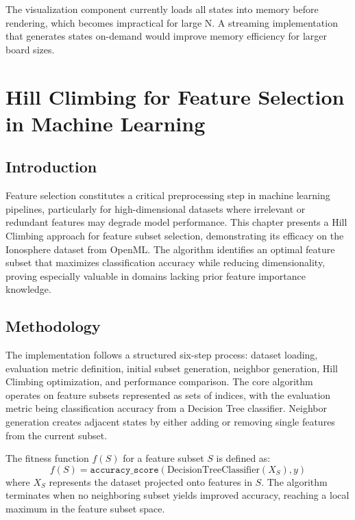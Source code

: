 \documentclass{report}
\begin{document}
	The visualization component currently loads all states into memory before rendering, which becomes impractical for large N. A streaming implementation that generates states on-demand would improve memory efficiency for larger board sizes.
	
	
	
	
	
	\chapter{Hill Climbing for Feature Selection in Machine Learning}
	
	\section{Introduction}
	Feature selection constitutes a critical preprocessing step in machine learning pipelines, particularly for high-dimensional datasets where irrelevant or redundant features may degrade model performance. This chapter presents a Hill Climbing approach for feature subset selection, demonstrating its efficacy on the Ionosphere dataset from OpenML. The algorithm identifies an optimal feature subset that maximizes classification accuracy while reducing dimensionality, proving especially valuable in domains lacking prior feature importance knowledge.
	
	\section{Methodology}
	The implementation follows a structured six-step process: dataset loading, evaluation metric definition, initial subset generation, neighbor generation, Hill Climbing optimization, and performance comparison. The core algorithm operates on feature subsets represented as sets of indices, with the evaluation metric being classification accuracy from a Decision Tree classifier. Neighbor generation creates adjacent states by either adding or removing single features from the current subset.
	
	The fitness function $f(S)$ for a feature subset $S$ is defined as:
	\begin{equation}
		f(S) = \texttt{accuracy\_score}(\text{DecisionTreeClassifier}(X_S), y)
	\end{equation}
	where $X_S$ represents the dataset projected onto features in $S$. The algorithm terminates when no neighboring subset yields improved accuracy, reaching a local maximum in the feature subset space.
	
\end{document}
